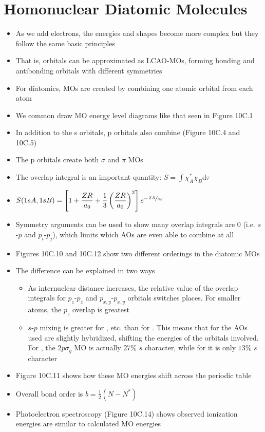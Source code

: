 \documentclass[12pt, openany, letterpaper]{memoir}
\begin{document}
\section{Homonuclear Diatomic Molecules}
\begin{itemize}
	\item As we add electrons, the energies and shapes become more complex but they follow the same basic principles
	\item That is, orbitals can be approximated as LCAO-MOs, forming bonding and antibonding orbitals with different symmetries
	\item For diatomics, MOs are created by combining one atomic orbital from each atom
	\item We common draw MO energy level diagrams like that seen in Figure 10C.1
	\item In addition to the s orbitals, p orbitals also combine (Figure 10C.4 and 10C.5)
	\item The p orbitals create both $\sigma$ and $\pi$ MOs
	\item The overlap integral is an important quantity: $S=\displaystyle\int \chi_{A}^{*} \chi_{B} \mathrm{d}\tau$
	\item $S(1sA,1sB)=\left[1+\dfrac{ZR}{a_0}+\dfrac{1}{3}\left(\dfrac{ZR}{a_0}\right)^2\right]e^{-\nicefrac{ZR}{a_0}}$
	\item Symmetry arguments can be used to show many overlap integrals are 0 (i.e. $s$-$p$ and $p_i$-$p_j$), which limits which AOs are even able to combine at all
	\item Figures 10C.10 and 10C.12 show two different orderings in the diatomic MOs
	\item The difference can be explained in two ways
	\begin{itemize}
		\item As internuclear distance increases, the relative value of the overlap integrals for $p_z$-$p_z$ and $p_{x,y}$-$p_{x,y}$ orbitals switches places. For smaller atoms, the $p_z$ overlap is greatest
		\item $s$-$p$ mixing is greater for , etc. than for . This means that for  the AOs used are slightly hybridized, shifting the energies of the orbitals involved. For , the $2p\sigma_g$ MO is actually $27\%$ $s$ character, while for  it is only $13\%$ $s$ character
	\end{itemize}
	\item Figure 10C.11 shows how these MO energies shift across the periodic table
	\item Overall bond order is $b=\frac{1}{2}\left(N-N^*\right)$
	\item Photoelectron spectroscopy (Figure 10C.14) shows observed ionization energies are similar to calculated MO energies
\end{itemize}
\end{document}
